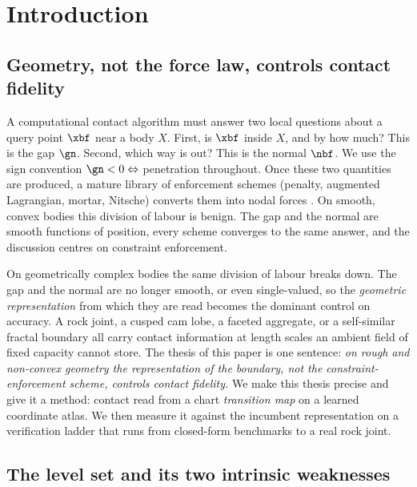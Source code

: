 \section{Introduction}\label{sec:intro}

\subsection{Geometry, not the force law, controls contact fidelity}\label{sec:intro-motivation}

A computational contact algorithm must answer two local questions about a query point $\xbf$ near a
body $X$. First, is $\xbf$ inside $X$, and by how much? This is the gap $\gn$. Second, which way is
out? This is the normal $\nbf$. We use the sign convention $\gn<0\Leftrightarrow$ penetration throughout.
Once these two quantities are produced, a mature library of enforcement schemes (penalty, augmented
Lagrangian, mortar, Nitsche) converts them into nodal forces \citep{wriggers2006computational,
laursen2002computational,kikuchi1988contact}. On smooth, convex bodies this division of labour is
benign. The gap and the normal are smooth functions of position, every scheme converges to the same
answer, and the discussion centres on constraint enforcement.

On geometrically complex bodies the same division of labour breaks down. The gap and the normal are
no longer smooth, or even single-valued, so the \emph{geometric representation} from which they are read
becomes the dominant control on accuracy. A rock joint, a cusped cam lobe, a faceted aggregate, or a
self-similar fractal boundary all carry contact information at length scales an ambient field of fixed
capacity cannot store. The thesis of this paper is one sentence: \emph{on rough and non-convex
geometry the representation of the boundary, not the constraint-enforcement scheme, controls contact
fidelity.} We make this thesis precise and give it a method: contact read from a chart
\emph{transition map} on a learned coordinate atlas. We then measure it against the incumbent
representation on a verification ladder that runs from closed-form benchmarks to a real rock joint.

\subsection{The level set and its two intrinsic weaknesses}\label{sec:intro-levelset}

